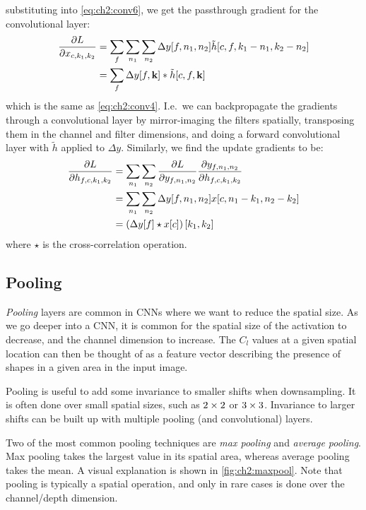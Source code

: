 substituting into \eqref{eq:ch2:conv6}, we get the passthrough gradient for the
convolutional layer:
\begin{align}
  \frac{\partial L}{\partial x_{c,k_1,k_2}} &= \sum_f \sum_{n_1} \sum_{n_2} \Delta y[f, n_1, n_2] \tilde{h}[c, f, k_1-n_1, k_2-n_2 ] \\
                          &= \sum_f \Delta y[f, \mathbf{k}] \ast \tilde{h}[c, f, \mathbf{k}] \label{eq:ch2:cnn_passthrough}
\end{align}
which is the same as \eqref{eq:ch2:conv4}. I.e.\ we can backpropagate the
gradients through a convolutional layer by mirror-imaging the filters spatially,
transposing them in the channel and filter dimensions, and doing a forward
convolutional layer with $\tilde{h}$ applied to $\Delta y$. Similarly, we
find the update gradients to be:
\begin{align}
  \frac{\partial L}{\partial h_{f,c,k_1,k_2}} &= \sum_{n_1} \sum_{n_2} \frac{\partial L}{\partial y_{f, n_1, n_2}} \frac{\partial y_{f, n_1, n_2}}{\partial h_{f, c, k_1, k_2}}  \\
                            &= \sum_{n_1} \sum_{n_2} \Delta y[f, n_1, n_2] x[c, n_1-k_1, n_2-k_2 ] \\
                            &= \left(\Delta y[f] \star x[c]\right)[k_1, k_2] \label{eq:ch2:cnn_weight_update}
\end{align}
where $\star$ is the cross-correlation operation.

\subsection{Pooling}
\emph{Pooling} layers are common in CNNs where we want to reduce the spatial size. As
we go deeper into a CNN, it is common for the spatial size of the activation to
decrease, and the channel dimension to increase. The $C_l$ values at a given
spatial location can then be thought of as a feature vector describing the
presence of shapes in a given area in the input image.

Pooling is useful to add some invariance to smaller shifts when downsampling. It
is often done over small spatial sizes, such as $2\times 2$ or $3\times 3$. Invariance
to larger shifts can be built up with multiple pooling (and convolutional) layers.

Two of the most common pooling techniques are \emph{max pooling} and
\emph{average pooling}. Max pooling takes the largest value in its spatial area,
whereas average pooling takes the mean. A visual explanation is shown in
\autoref{fig:ch2:maxpool}. Note that pooling is typically a spatial operation,
and only in rare cases is done over the channel/depth dimension.

